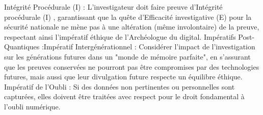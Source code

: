 \documentclass[]{article}
\begin{document}
Intégrité Procédurale (I) : L'investigateur doit faire preuve d'Intégrité procédurale (I) , garantissant que la quête d'Efficacité investigative (E) pour la sécurité nationale ne mène pas à une altération (même involontaire) de la preuve, respectant ainsi l'impératif éthique de l'Archéologue du digital.
Impératifs Post-Quantiques :Impératif Intergénérationnel : Considérer l'impact de l'investigation sur les générations futures dans un "monde de mémoire parfaite", en s'assurant que les preuves conservées ne pourront pas être compromises par des technologies futures, mais aussi que leur divulgation future respecte un équilibre éthique.
Impératif de l'Oubli : Si des données non pertinentes ou personnelles sont capturées, elles doivent être traitées avec respect pour le droit fondamental à l'oubli numérique.
\end{document}
